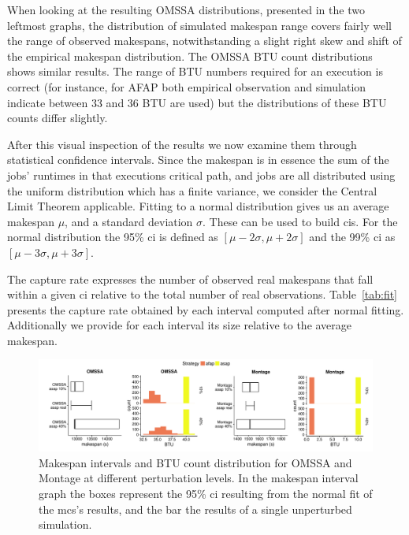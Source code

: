 \documentclass[10pt,conference,compsocconf]{IEEEtran}
\begin{document}
When looking at the resulting OMSSA distributions, presented in the two leftmost
graphs,  the distribution  of simulated  makespan range  covers fairly  well the
range of  observed makespans, notwithstanding a  slight right skew and  shift of
the empirical  makespan distribution.  The  OMSSA BTU count  distributions shows
similar results.  The range of BTU  numbers required for an execution is correct
(for  instance, for  AFAP  both empirical  observation  and simulation  indicate
between  33 and  36 BTU  are used)  but the  distributions of  these BTU  counts
differ slightly.


After  this  visual inspection  of  the  results  we  now examine  them  through
statistical confidence intervals.   Since the makespan is in essence  the sum of
the jobs' runtimes  in that  executions critical path,  and jobs  are all
distributed  using the  uniform distribution  which  has a  finite variance,  we
consider the Central Limit Theorem applicable.  Fitting to a normal distribution
gives us an average makespan $\mu{}$, and a standard deviation $\sigma{}$. These
can be used to  build \acp{ci}. For the normal distribution  the 95\% \ac{ci} is
defined  as   $[\mu{}-2\sigma{},\mu{}+2\sigma{}]$  and   the  99\%   \ac{ci}  as
$[\mu{}-3\sigma{},\mu{}+3\sigma{}]$.

The capture rate expresses the number of observed real makespans that fall
within a given \ac{ci} relative to the total number of real observations.
Table~\ref{tab:fit} presents the capture rate obtained by each interval computed
after normal fitting.  Additionally we provide for each interval its size
relative to the average makespan.

\begin{figure}
	\includegraphics[width=\textwidth]{gfx/int_plot.pdf}
	\caption{Makespan intervals and BTU count distribution for OMSSA and 
	Montage at different perturbation levels. In the makespan interval graph 
	the boxes represent the 95\% \ac{ci} resulting from the normal fit of the
	\acs{mcs}'s results, and the bar the results of a single unperturbed 
	simulation.}\label{fig:int}
\end{figure}
\end{document}
